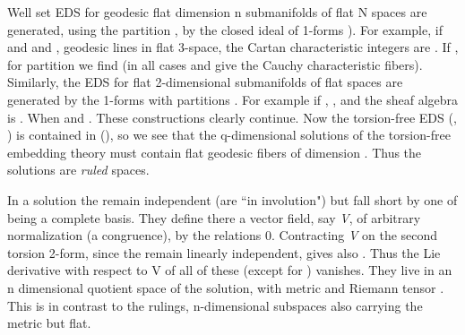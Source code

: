 \documentclass[a4paper,a4paper]{article}
\begin{document}
   Well set EDS for geodesic flat dimension n submanifolds of flat
N spaces are generated,  using the partition \coordHE{},  by the closed ideal
of 1-forms \coordHE{}).
For example,  if \coordHE{} and \coordHE{} and \coordHE{},   geodesic lines in
flat 3-space,  the Cartan characteristic integers are
\coordHE{}.  If \coordHE{},  for partition \coordHE{} we find \coordHE{} (in all cases \coordHE{} and
\coordHE{}
give the Cauchy characteristic fibers).  Similarly,  the EDS for flat
2-dimensional submanifolds of flat \coordHE{} spaces are generated by the 1-forms 
with partitions \coordHE{}.  For example if \coordHE{}, \coordHE{},  and  the sheaf
algebra is \coordHE{}. When \coordHE{} and \coordHE{}.  These
constructions clearly continue.  Now the torsion-free EDS
(\coordHE{},  \coordHE{}) is contained in (\coordHE{}), so we see that the q-dimensional solutions of the torsion-free
embedding theory must contain flat geodesic fibers of dimension \coordHE{}.  Thus 
the solutions are {\itshape ruled }spaces.

        In a solution the \coordHE{} remain independent (are
``in involution") but fall short by one of being a complete basis.  They
define there a vector  field,  say {\itshape V},  of arbitrary normalization (a
congruence),  by the relations   \coordHE{}{\itshape
 } \myHighlight{\(=\)}\coordHE{}  \coordHE{} \myHighlight{\(=\)}\coordHE{} {\itshape  }\coordHE{}\myHighlight{\( \)}\coordHE{}\myHighlight{\(=\)}\coordHE{}  0.
 Contracting {\itshape V} on the second torsion 2-form,  since the 
\coordHE{} remain linearly independent,  gives also \coordHE{}.  Thus the Lie derivative with respect to V of all of
these (except for \coordHE{}) vanishes.  They live in an
n dimensional quotient space of the solution,  with metric \coordHE{} and Riemann tensor \coordHE{}.  This is in contrast to the rulings,
n-dimensional subspaces also carrying the metric  \coordHE{} but flat.
\end{document}

